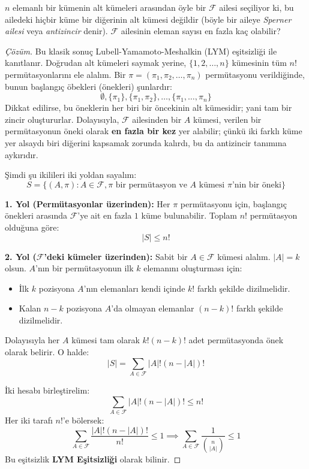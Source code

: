 \begin{example}
$n$ elemanlı bir kümenin alt kümeleri arasından öyle bir $\mathcal{F}$ ailesi seçiliyor ki, bu ailedeki hiçbir küme bir diğerinin alt kümesi değildir (böyle bir aileye \textit{Sperner ailesi} veya \textit{antizincir} denir). $\mathcal{F}$ ailesinin eleman sayısı en fazla kaç olabilir?
\end{example}

\begin{proof}[Çözüm]
Bu klasik sonuç Lubell-Yamamoto-Meshalkin (LYM) eşitsizliği ile kanıtlanır.
Doğrudan alt kümeleri saymak yerine, $\{1, 2, \dots, n\}$ kümesinin tüm $n!$ permütasyonlarını ele alalım.
Bir $\pi = (\pi_1, \pi_2, \dots, \pi_n)$ permütasyonu verildiğinde, bunun başlangıç öbekleri (önekleri) şunlardır:
\[ \emptyset, \{\pi_1\}, \{\pi_1, \pi_2\}, \dots, \{\pi_1, \dots, \pi_n\} \]
Dikkat edilirse, bu öneklerin her biri bir öncekinin alt kümesidir; yani tam bir zincir oluştururlar.
Dolayısıyla, $\mathcal{F}$ ailesinden bir $A$ kümesi, verilen bir permütasyonun öneki olarak \textbf{en fazla bir kez} yer alabilir; çünkü iki farklı küme yer alsaydı biri diğerini kapsamak zorunda kalırdı, bu da antizincir tanımına aykırıdır.

Şimdi şu ikilileri iki yoldan sayalım:
\[ S = \{ (A, \pi) : A \in \mathcal{F}, \pi \text{ bir permütasyon ve } A \text{ kümesi } \pi\text{'nin bir öneki} \} \]

\textbf{1. Yol (Permütasyonlar üzerinden):}
Her $\pi$ permütasyonu için, başlangıç önekleri arasında $\mathcal{F}$'ye ait en fazla $1$ küme bulunabilir. Toplam $n!$ permütasyon olduğuna göre:
\[ |S| \le n! \]

\textbf{2. Yol ($\mathcal{F}$'deki kümeler üzerinden):}
Sabit bir $A \in \mathcal{F}$ kümesi alalım. $|A| = k$ olsun. $A$'nın bir permütasyonun ilk $k$ elemanını oluşturması için:
\begin{itemize}
    \item İlk $k$ pozisyona $A$'nın elemanları kendi içinde $k!$ farklı şekilde dizilmelidir.
    \item Kalan $n-k$ pozisyona $A$'da olmayan elemanlar $(n-k)!$ farklı şekilde dizilmelidir.
\end{itemize}
Dolayısıyla her $A$ kümesi tam olarak $k!(n-k)!$ adet permütasyonda önek olarak belirir. O halde:
\[ |S| = \sum_{A \in \mathcal{F}} |A|!(n - |A|)! \]

İki hesabı birleştirelim:
\[ \sum_{A \in \mathcal{F}} |A|!(n - |A|)! \le n! \]
Her iki tarafı $n!$'e bölersek:
\[ \sum_{A \in \mathcal{F}} \frac{|A|!(n - |A|)!}{n!} \le 1 \implies \sum_{A \in \mathcal{F}} \frac{1}{\binom{n}{|A|}} \le 1 \]
Bu eşitsizlik \textbf{LYM Eşitsizliği} olarak bilinir.


\end{proof}
